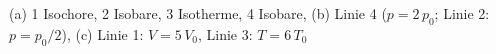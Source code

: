 (a) 1 Isochore, 2 Isobare, 3 Isotherme, 4 Isobare, (b) Linie 4 ($p = 2\,p_0$; Linie 2: $p = p_0/2$), (c) Linie 1: $V = 5\,V_0$, Linie 3: $T = 6\,T_0$
